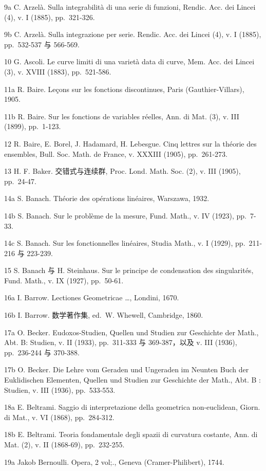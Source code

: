 9a C. Arzelà. Sulla integrabilità di una serie di funzioni, Rendic. Acc. dei Lincei (4), v. I (1885), pp.~321-326.

9b C. Arzelà. Sulla integrazione per serie. Rendic. Acc. dei Lincei (4), v. I (1885), pp.~532-537 与 566-569.

10 G. Ascoli. Le curve limiti di una varietà data di curve, Mem. Acc. dei Lincei (3), v. XVIII (1883), pp.~521-586.

11a R. Baire. Leçons sur les fonctions discontinues, Paris (Gauthier-Villars), 1905.

11b R. Baire. Sur les fonctions de variables réelles, Ann. di Mat. (3), v. III (1899), pp.~1-123.

12 R. Baire, E. Borel, J. Hadamard, H. Lebesgue. Cinq lettres sur la théorie des ensembles, Bull. Soc. Math. de France, v. XXXIII (1905), pp.~261-273.

13 H. F. Baker. 交错式与连续群, Proc. Lond. Math. Soc. (2), v. III (1905), pp.~24-47.

14a S. Banach. Théorie des opérations linéaires, Warszawa, 1932.

14b S. Banach. Sur le problème de la mesure, Fund. Math., v. IV (1923), pp.~7-33.

14c S. Banach. Sur les fonctionnelles linéaires, Studia Math., v. I (1929), pp.~211-216 与 223-239.

15 S. Banach 与 H. Steinhaus. Sur le principe de condensation des singularités, Fund. Math., v. IX (1927), pp.~50-61.

16a I. Barrow. Lectiones Geometricae \ldots, Londini, 1670.

16b I. Barrow. 数学著作集, ed.~W. Whewell, Cambridge, 1860.

17a O. Becker. Eudoxos-Studien, Quellen und Studien zur Geschichte der Math., Abt. B: Studien, v. II (1933), pp.~311-333 与 369-387，以及 v. III (1936), pp.~236-244 与 370-388.

17b O. Becker. Die Lehre vom Geraden und Ungeraden im Neunten Buch der Euklidischen Elementen, Quellen und Studien zur Geschichte der Math., Abt. B : Studien, v. III (1936), pp.~533-553.

18a E. Beltrami. Saggio di interpretazione della geometrica non-euclidean, Giorn. di Mat., v. VI (1868), pp.~284-312.

18b E. Beltrami. Teoria fondamentale degli spazii di curvatura costante, Ann. di Mat. (2), v. II (1868-69), pp.~232-255.

19a Jakob Bernoulli. Opera, 2 vol;., Geneva (Cramer-Philibert), 1744.

